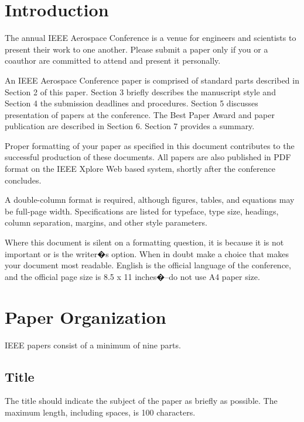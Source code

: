 \documentclass[twocolumn,letterpaper]{IEEEAerospaceCLS}  %
\begin{document}
\tableofcontents

\section{Introduction}
The annual IEEE Aerospace Conference is a venue for engineers and scientists to present their work to one another. Please submit a paper only if you or a coauthor are committed to attend and present it personally.

An IEEE Aerospace Conference paper is comprised of standard parts described in Section 2 of this paper. Section 3 briefly describes the manuscript style and Section 4 the submission deadlines and procedures. Section 5 discusses presentation of papers at the conference. The Best Paper Award and paper publication are described in Section 6. Section 7 provides a summary.

Proper formatting of your paper as specified in this document contributes to the successful production of these documents. All papers are also published in PDF format on the IEEE Xplore Web based system, shortly after the conference concludes.

A double-column format is required, although figures, tables, and equations may be full-page width. Specifications are listed for typeface, type size, headings, column separation, margins, and other style parameters.

Where this document is silent on a formatting question, it is because it is not important or is the writer�s option. When in doubt make a choice that makes your document most readable. English is the official language of the conference, and the official page size is 8.5 x 11 inches�--do not use A4 paper size.



\section{Paper Organization}
IEEE papers consist of a minimum of nine parts.

\subsection{Title}
The title should indicate the subject of the paper as briefly as possible. The maximum length, including spaces, is 100 characters.
\end{document}
